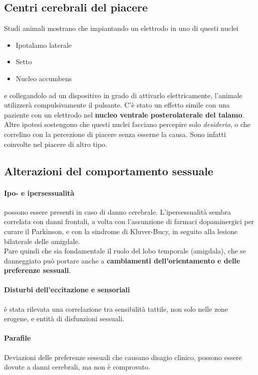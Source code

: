 \documentclass[12pt, a4paper]{article}
\begin{document}
\subsection{Centri cerebrali del piacere} 

Studi animali mostrano che impiantando un elettrodo in uno di questi nuclei
\begin{itemize}
    \item Ipotalamo laterale 
    \item Setto
    \item Nucleo accumbens
\end{itemize}
e collegandolo ad un dispositivo in grado di attivarlo elettricamente, l'animale utilizzerà compulsivamente il pulsante.
C'è stato un effetto simile con una paziente con un elettrodo nel \textbf{nucleo ventrale posterolaterale del talamo}.
\medskip\\ 
Altre ipotesi sostengono che questi nuclei facciano percepire solo \emph{desiderio}, o che correlino con la percezione di piacere senza esserne la causa. Sono infatti coinvolte nel piacere di altro tipo.

\subsection{Alterazioni del comportamento sessuale}

\paragraph{Ipo- e ipersessualità} possono essere presenti in caso di danno cerebrale. L'ipersessualità sembra correlata con danni frontali, a volta con l'assunzione di farmaci dopaminergici per curare il Parkinson, e con la sindrome di Kluver-Bucy, in seguito alla lesione bilaterale delle amigdale.
\medskip\\ 
Pare quindi che sia fondamentale il ruolo del lobo temporale (amigdala), che se danneggiato può portare anche a \textbf{cambiamenti dell'orientamento e delle preferenze sessuali}. 

\paragraph{Disturbi dell'eccitazione e sensoriali}  è stata rilevata una correlazione tra sensibilità tattile, non solo nelle zone erogene, e entità di disfunzioni sessuali.

\paragraph{Parafile}  Deviazioni delle preferenze sessuali che causano disagio clinico, possono essere dovute a danni cerebrali, ma non è comprovato.
\end{document}
